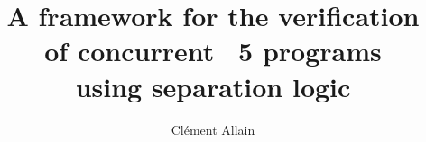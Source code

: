 \documentclass[review,english]{jflart}
\title{
  A framework for the verification \\
  of concurrent \OCaml~5 programs \\
  using separation logic
}
\author{Clément Allain}
\affil{INRIA}
\begin{document}
\maketitle

\begin{abstract}
  
\end{abstract}













\newpage
\printbibliography
\end{document}

